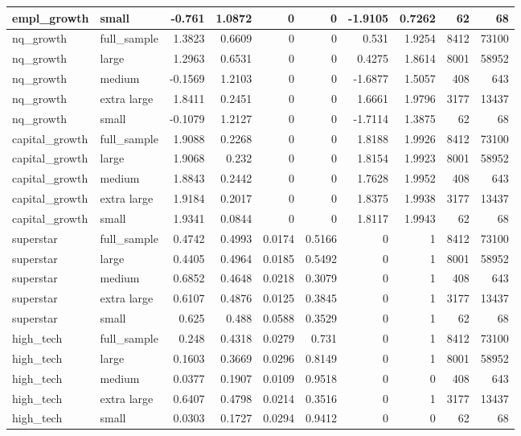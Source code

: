 \begin{table}[h]
\begin{tabular}{l lr r r r r r r r}
empl\_growth & small & -0.761 & 1.0872 & 0 & 0 & -1.9105 & 0.7262 & 62&68\\
\hline
nq\_growth & full\_sample & 1.3823 & 0.6609 & 0 & 0 & 0.531 & 1.9254 & 8412&73100\\
nq\_growth & large & 1.2963 & 0.6531 & 0 & 0 & 0.4275 & 1.8614 & 8001&58952\\
nq\_growth & medium & -0.1569 & 1.2103 & 0 & 0 & -1.6877 & 1.5057 & 408&643\\
nq\_growth & extra large & 1.8411 & 0.2451 & 0 & 0 & 1.6661 & 1.9796 & 3177&13437\\
nq\_growth & small & -0.1079 & 1.2127 & 0 & 0 & -1.7114 & 1.3875 & 62&68\\
\hline
capital\_growth & full\_sample & 1.9088 & 0.2268 & 0 & 0 & 1.8188 & 1.9926 & 8412&73100\\
capital\_growth & large & 1.9068 & 0.232 & 0 & 0 & 1.8154 & 1.9923 & 8001&58952\\
capital\_growth & medium & 1.8843 & 0.2442 & 0 & 0 & 1.7628 & 1.9952 & 408&643\\
capital\_growth & extra large & 1.9184 & 0.2017 & 0 & 0 & 1.8375 & 1.9938 & 3177&13437\\
capital\_growth & small & 1.9341 & 0.0844 & 0 & 0 & 1.8117 & 1.9943 & 62&68\\
\hline
superstar & full\_sample & 0.4742 & 0.4993 & 0.0174 & 0.5166 & 0 & 1 & 8412&73100\\
superstar & large & 0.4405 & 0.4964 & 0.0185 & 0.5492 & 0 & 1 & 8001&58952\\
superstar & medium & 0.6852 & 0.4648 & 0.0218 & 0.3079 & 0 & 1 & 408&643\\
superstar & extra large & 0.6107 & 0.4876 & 0.0125 & 0.3845 & 0 & 1 & 3177&13437\\
superstar & small & 0.625 & 0.488 & 0.0588 & 0.3529 & 0 & 1 & 62&68\\
\hline
high\_tech & full\_sample & 0.248 & 0.4318 & 0.0279 & 0.731 & 0 & 1 & 8412&73100\\
high\_tech & large & 0.1603 & 0.3669 & 0.0296 & 0.8149 & 0 & 1 & 8001&58952\\
high\_tech & medium & 0.0377 & 0.1907 & 0.0109 & 0.9518 & 0 & 0 & 408&643\\
high\_tech & extra large & 0.6407 & 0.4798 & 0.0214 & 0.3516 & 0 & 1 & 3177&13437\\
high\_tech & small & 0.0303 & 0.1727 & 0.0294 & 0.9412 & 0 & 0 & 62&68\\
\hline
\hline
\end{tabular}
\end{table}